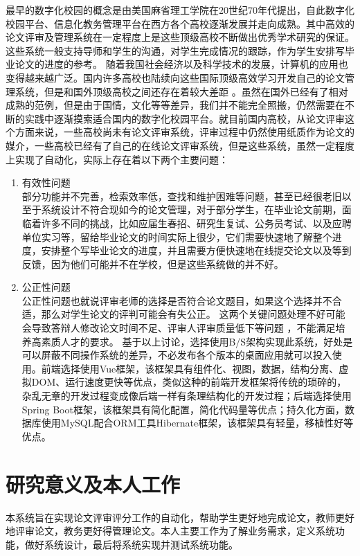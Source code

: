 最早的数字化校园的概念是由美国麻省理工学院在20世纪70年代提出\cite{张磊2020数字校园下高职院校教务管理系统设计}，自此数字化校园平台、信息化教务管理平台在西方各个高校逐渐发展并走向成熟。其中高效的论文评审及管理系统在一定程度上是这些顶级高校不断做出优秀学术研究的保证。这些系统一般支持导师和学生的沟通，对学生完成情况的跟踪，作为学生安排写毕业论文的进度的参考。
随着我国社会经济以及科学技术的发展，计算机的应用也变得越来越广泛\cite{.2020h}。国内许多高校也陆续向这些国际顶级高效学习开发自己的论文管理系统，但是和国外顶级高校之间还存在着较大差距 \cite{.2017e}。虽然在国外已经有了相对成熟的范例，但是由于国情，文化等等差异，我们并不能完全照搬，仍然需要在不断的实践中逐渐摸索适合国内的数字化校园平台。就目前国内高校，从论文评审这个方面来说，一些高校尚未有论文评审系统，评审过程中仍然使用纸质作为论文的媒介，一些高校已经有了自己的在线论文评审系统，但是这些系统，虽然一定程度上实现了自动化，实际上存在着以下两个主要问题：
\begin{enumerate}
	\item 有效性问题\cite{.2019d}\\
	      部分功能并不完善，检索效率低，查找和维护困难等问题，甚至已经很老旧以至于系统设计不符合现如今的论文管理，对于部分学生，在毕业论文前期，面临着许多不同的挑战，比如应届生春招、研究生复试、公务员考试、以及应聘单位实习等，留给毕业论文的时间实际上很少\cite{.2019c}，它们需要快速地了解整个进度，安排整个写毕业论文的进度，并且需要方便快速地在线提交论文以及等到反馈，因为他们可能并不在学校，但是这些系统做的并不好。
	\item 公正性问题\cite{.2019d}\\
	      公正性问题也就说评审老师的选择是否符合论文题目，如果这个选择并不合适，那么对学生论文的评判可能会有失公正\cite{Setiyani.2020}。
	      这两个关键问题处理不好可能会导致答辩人修改论文时间不足、评审人评审质量低下等问题 ，不能满足培养高素质人才的要求\cite{.2019d}。
	      基于以上讨论，选择使用B/S架构实现此系统，好处是可以屏蔽不同操作系统的差异，不必发布各个版本的桌面应用就可以投入使用。前端选择使用Vue框架，该框架具有组件化、视图，数据，结构分离、虚拟DOM、运行速度更快等优点，类似这种的前端开发框架将传统的琐碎的，杂乱无章的开发过程变成像后端一样有条理结构化的开发过程；后端选择使用Spring Boot框架，该框架具有简化配置，简化代码量等优点；持久化方面，数据库使用MySQL配合ORM工具Hibernate框架，该框架具有轻量，移植性好等优点。
\end{enumerate}

\section{研究意义及本人工作}

本系统旨在实现论文评审评分工作的自动化，帮助学生更好地完成论文，教师更好地评审论文，教务更好得管理论文。本人主要工作为了解业务需求，定义系统功能，做好系统设计，最后将系统实现并测试系统功能。